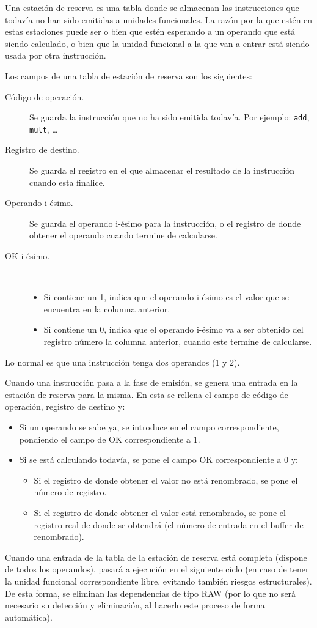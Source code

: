 Una estación de reserva es una tabla donde se almacenan las instrucciones que todavía no han sido emitidas a unidades funcionales. La razón por la que estén en estas estaciones puede ser o bien que estén esperando a un operando que está siendo calculado, o bien que la unidad funcional a la que van a entrar está siendo usada por otra instrucción.

Los campos de una tabla de estación de reserva son los siguientes:
\begin{description}
    \item [Código de operación.] Se guarda la instrucción que no ha sido emitida todavía. Por ejemplo: \verb|add|, \verb|mult|, \ldots
    \item [Registro de destino.] Se guarda el registro en el que almacenar el resultado de la instrucción cuando esta finalice.
    \item [Operando i-ésimo.] Se guarda el operando i-ésimo para la instrucción, o el registro de donde obtener el operando cuando termine de calcularse.
    \item [OK i-ésimo.]\ 
        \begin{itemize}
            \item Si contiene un 1, indica que el operando i-ésimo es el valor que se encuentra en la columna anterior.
            \item Si contiene un 0, indica que el operando i-ésimo va a ser obtenido del registro número la columna anterior, cuando este termine de calcularse.
        \end{itemize}
\end{description}
Lo normal es que una instrucción tenga dos operandos (1 y 2).

Cuando una instrucción pasa a la fase de emisión, se genera una entrada en la estación de reserva para la misma. En esta se rellena el campo de código de operación, registro de destino y:
\begin{itemize}
    \item Si un operando se sabe ya, se introduce en el campo correspondiente, pondiendo el campo de OK correspondiente a 1.
    \item Si se está calculando todavía, se pone el campo OK correspondiente a 0 y:
        \begin{itemize}
            \item Si el registro de donde obtener el valor no está renombrado, se pone el número de registro.
            \item Si el registro de donde obtener el valor está renombrado, se pone el registro real de donde se obtendrá (el número de entrada en el buffer de renombrado).
        \end{itemize}
\end{itemize}
Cuando una entrada de la tabla de la estación de reserva está completa (dispone de todos los operandos), pasará a ejecución en el siguiente ciclo (en caso de tener la unidad funcional correspondiente libre, evitando también riesgos estructurales). De esta forma, se eliminan las dependencias de tipo RAW (por lo que no será necesario su detección y eliminación, al hacerlo este proceso de forma automática).

